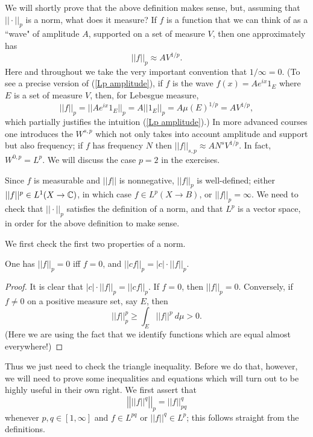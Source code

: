 We will shortly prove that the above definition makes sense, but, assuming that $||\cdot||_p$ is a norm, what does it measure?
If $f$ is a function that we can think of as a ``wave" of amplitude $A$, supported on a set of measure $V$, then one approximately has
\begin{equation}
\label{Lp amplitude}
||f||_p \approx AV^{1/p}.
\end{equation}
Here and throughout we take the very important convention that $1/\infty = 0$.
(To see a precise version of (\ref{Lp amplitude}), if $f$ is the wave $f(x) = Ae^{ix}1_E$ where $E$ is a set of measure $V$, then, for Lebesgue measure,
\[||f||_p = ||Ae^{ix}1_E||_p = A ||1_E||_p = A\mu(E)^{1/p} = AV^{1/p},\]
which partially justifies the intuition (\ref{Lp amplitude}).)
In more advanced courses one introduces the  $W^{s,p}$ which not only takes into account amplitude and support but also frequency; if $f$ has frequency $N$ then $||f||_{s,p} \approx AN^sV^{1/p}$.
In fact, $W^{0,p} = L^p$.
We will discuss the case $p = 2$ in the exercises.

Since $f$ is measurable and $||f||$ is nonnegative, $||f||_p$ is well-defined; either $||f||^p \in L^1(X \to \mathbb{C})$, in which case $f \in L^p(X \to B)$, or $||f||_p = \infty$.
We need to check that $||\cdot||_p$ satisfies the definition of a norm, and that $L^p$ is a vector space, in order for the above definition to make sense.

We first check the first two properties of a norm.
\begin{lemma}
One has $||f||_p = 0$ iff $f = 0$, and $||cf||_p = |c|\cdot||f||_p$.
\end{lemma}
\begin{proof}
It is clear that $|c|\cdot||f||_p = ||cf||_p$.
If $f = 0$, then $||f||_p = 0$.
Conversely, if $f \neq 0$ on a positive measure set, say $E$, then
\[||f||_p^p \geq \int_E ||f||^p ~d\mu > 0.\]
(Here we are using the fact that we identify functions which are equal almost everywhere!)
\end{proof}

Thus we just need to check the triangle inequality. Before we do that, however, we will need to prove some inequalities and equations which will turn out to be highly useful in their own right.
We first assert that
\begin{equation}
\label{pull exponent of Lp}
\left|\left|||f||^q\right|\right|_p = ||f||_{pq}^q
\end{equation}
whenever $p, q \in [1, \infty]$ and $f \in L^{pq}$ or $||f||^q \in L^p$; this follows straight from the definitions.

